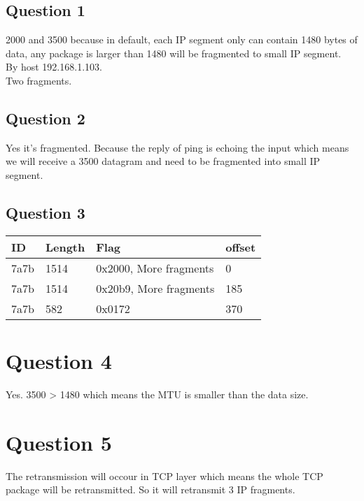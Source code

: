 \documentclass{article}
\begin{document}
\subsection{Question 1}

2000 and 3500 because in default, each IP segment only can contain 1480 bytes of data, any package is larger than 1480 will be fragmented to small IP segment. \\
By host 192.168.1.103.\\
Two fragments.

\subsection{Question 2}

Yes it's fragmented. Because the reply of ping is echoing the input which means we will receive a 3500 datagram and need to be fragmented into small IP segment.

\subsection{Question 3}

\begin{tabular}{ l l l l }
    ID & Length & Flag & offset \\
    \hline
    7a7b & 1514 & 0x2000, More fragments & 0 \\
    7a7b & 1514 & 0x20b9, More fragments & 185 \\
    7a7b & 582  & 0x0172 & 370\\
\end{tabular}

\section{Question 4}
Yes. 3500 > 1480 which means the MTU is smaller than the data size.

\section{Question 5}

The retransmission will occour in TCP layer which means the whole TCP package will be retransmitted. So it will retransmit 3 IP fragments.
\end{document}
